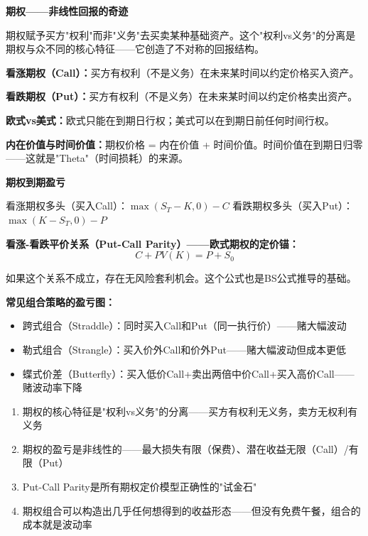 \documentclass[a4paper,11pt]{ctexbook}
\begin{document}
\begin{qualitative}
\textbf{期权——非线性回报的奇迹}

期权赋予买方"权利"而非"义务"去买卖某种基础资产。这个"权利vs义务"的分离是期权与众不同的核心特征——它创造了不对称的回报结构。

\textbf{看涨期权（Call）：}买方有权利（不是义务）在未来某时间以约定价格买入资产。

\textbf{看跌期权（Put）：}买方有权利（不是义务）在未来某时间以约定价格卖出资产。

\textbf{欧式vs美式：}欧式只能在到期日行权；美式可以在到期日前任何时间行权。

\textbf{内在价值与时间价值：}期权价格 = 内在价值 + 时间价值。时间价值在到期日归零——这就是"Theta"（时间损耗）的来源。
\end{qualitative}

\begin{quantitative}
\textbf{期权到期盈亏}

看涨期权多头（买入Call）：$\max(S_T - K, 0) - C$
看跌期权多头（买入Put）：$\max(K - S_T, 0) - P$

\textbf{看涨-看跌平价关系（Put-Call Parity）——欧式期权的定价锚：}
\[
C + PV(K) = P + S_0
\]

如果这个关系不成立，存在无风险套利机会。这个公式也是BS公式推导的基础。

\textbf{常见组合策略的盈亏图：}
\begin{itemize}
  \item 跨式组合（Straddle）：同时买入Call和Put（同一执行价）——赌大幅波动
  \item 勒式组合（Strangle）：买入价外Call和价外Put——赌大幅波动但成本更低
  \item 蝶式价差（Butterfly）：买入低价Call+卖出两倍中价Call+买入高价Call——赌波动率下降
\end{itemize}
\end{quantitative}

\begin{lessonsummary}
\begin{enumerate}
  \item 期权的核心特征是"权利vs义务"的分离——买方有权利无义务，卖方无权利有义务
  \item 期权的盈亏是非线性的——最大损失有限（保费）、潜在收益无限（Call）/有限（Put）
  \item Put-Call Parity是所有期权定价模型正确性的"试金石"
  \item 期权组合可以构造出几乎任何想得到的收益形态——但没有免费午餐，组合的成本就是波动率
\end{enumerate}
\end{lessonsummary}
\end{document}
